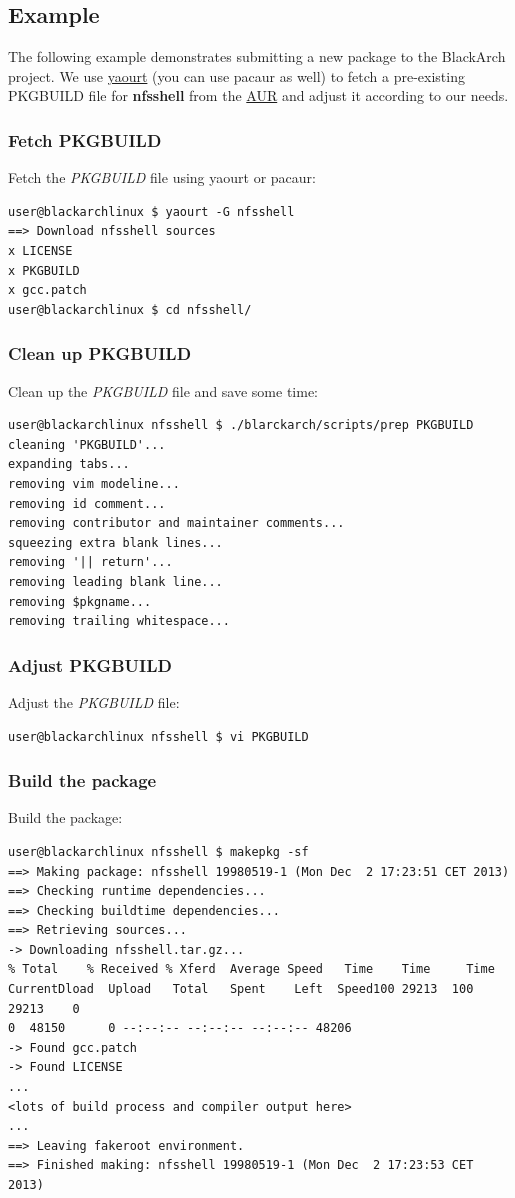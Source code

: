 \documentclass[a4paper, oneside, 11pt]{book}
\begin{document}
\subsection{Example}
The following example demonstrates submitting a new package to the BlackArch
project. We use \href{https://wiki.archlinux.org/index.php/yaourt}{yaourt}
(you can use pacaur as well) to fetch a pre-existing PKGBUILD file for
\textbf{nfsshell} from the \href{https://aur.archlinux.org/}{AUR} and adjust it
according to our needs.

\subsubsection{Fetch PKGBUILD}
Fetch the \textit{PKGBUILD} file using yaourt or pacaur:
{\small
\color{gray}
\begin{verbatim}
user@blackarchlinux $ yaourt -G nfsshell
==> Download nfsshell sources
x LICENSE
x PKGBUILD
x gcc.patch
user@blackarchlinux $ cd nfsshell/
\end{verbatim}
}

\subsubsection{Clean up PKGBUILD}
Clean up the \textit{PKGBUILD} file and save some time:
{\small
\color{gray}
\begin{verbatim}
user@blackarchlinux nfsshell $ ./blarckarch/scripts/prep PKGBUILD
cleaning 'PKGBUILD'...
expanding tabs...
removing vim modeline...
removing id comment...
removing contributor and maintainer comments...
squeezing extra blank lines...
removing '|| return'...
removing leading blank line...
removing $pkgname...
removing trailing whitespace...
\end{verbatim}
}

\subsubsection{Adjust PKGBUILD}
Adjust the \textit{PKGBUILD} file:
{\small
\color{gray}
\begin{verbatim}
user@blackarchlinux nfsshell $ vi PKGBUILD
\end{verbatim}
}

\subsubsection{Build the package}
Build the package:
{\small
\color{gray}
\begin{verbatim}
user@blackarchlinux nfsshell $ makepkg -sf
==> Making package: nfsshell 19980519-1 (Mon Dec  2 17:23:51 CET 2013)
==> Checking runtime dependencies...
==> Checking buildtime dependencies...
==> Retrieving sources...
-> Downloading nfsshell.tar.gz...
% Total    % Received % Xferd  Average Speed   Time    Time     Time
CurrentDload  Upload   Total   Spent    Left  Speed100 29213  100 29213    0
0  48150      0 --:--:-- --:--:-- --:--:-- 48206
-> Found gcc.patch
-> Found LICENSE
...
<lots of build process and compiler output here>
...
==> Leaving fakeroot environment.
==> Finished making: nfsshell 19980519-1 (Mon Dec  2 17:23:53 CET 2013)
\end{verbatim}
}
\end{document}
